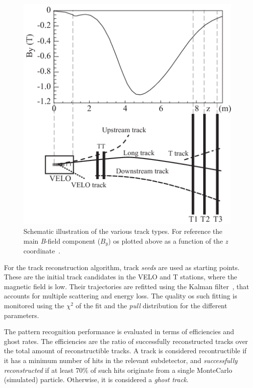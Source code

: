 \begin{figure} [htb!]
\begin{center}
\includegraphics[scale=0.6]{figs/TrackTypes.png}
\caption{Schematic illustration of the various track types. For reference the main \textit{B}-field component ($B_y$) os plotted above as a function of the \textit{z} coordinate~\cite{Aaij:2014jba}.\label{fig:lhcb_Tracks}}
\end{center}
\end{figure}

For the track reconstruction algorithm, track \textit{seeds} are used as starting points. These are the initial track candidates in the VELO and T stations, where the magnetic field is low. Their trajectories are refitted using the Kalman filter~\cite{Fruhwirth:1987fm}, that accounts for multiple scattering and energy loss. The quality os such fitting is monitored using the $\chi^2$ of the fit and the \textit{pull} distribution for the different parameters. 

The pattern recognition performance is evaluated in terms of efficiencies and ghost rates. The efficiencies are the ratio of successfully reconstructed tracks over the total amount of reconstructible tracks. A track is considered recontructible if it has a minimum number of hits in the relevant subdetector, and \textit{successfully reconstructed} if at least 70\% of such hits originate from a single MonteCarlo (simulated) particle. Otherwise, it is considered a \textit{ghost track}. 


